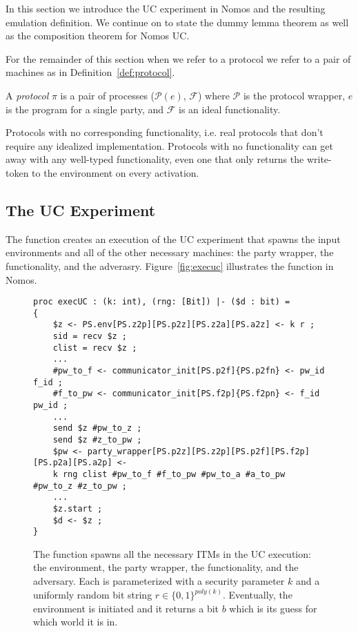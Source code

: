 In this section we introduce the UC experiment in Nomos and the resulting emulation definition.
We continue on to state the dummy lemma theorem as well as the composition theorem for Nomos UC.

For the remainder of this section when we refer to a protocol we refer to a pair of machines as in Definition~\ref{def:protocol}.

\begin{definition}\label{def:protocol}
	A \textit{protocol} $\pi$ is a pair of processes ($\mathcal{P}(e)$, $\mathcal{F}$) where $\mathcal{P}$ is the protocol wrapper, $e$ is the program for a single party, and $\mathcal{F}$ is an ideal functionality.
\end{definition}
 
Protocols with no corresponding functionality, i.e. real protocols that don't require any idealized implementation.
Protocols with no functionality can get away with any well-typed functionality, even one that only returns the write-token to the environment on every activation.


\subsection{The UC Experiment}
The  function creates an execution of the UC experiment that spawns the input environments and all of the other necessary machines: the party wrapper, the functionality, and the adverasry.
Figure~\ref{fig:execuc} illustrates the function in Nomos.

\begin{figure*}
\begin{lstlisting}[basicstyle=\small\ttfamily]
proc execUC : (k: int), (rng: [Bit]) |- ($d : bit) = 
{
    $z <- PS.env[PS.z2p][PS.p2z][PS.z2a][PS.a2z] <- k r ;
    sid = recv $z ;
    clist = recv $z ;
    ...
    #pw_to_f <- communicator_init[PS.p2f]{PS.p2fn} <- pw_id f_id ;
	#f_to_pw <- communicator_init[PS.f2p]{PS.f2pn} <- f_id pw_id ;
	...
	send $z #pw_to_z ;
	send $z #z_to_pw ;
	$pw <- party_wrapper[PS.p2z][PS.z2p][PS.p2f][PS.f2p][PS.p2a][PS.a2p] <-
	k rng clist #pw_to_f #f_to_pw #pw_to_a #a_to_pw #pw_to_z #z_to_pw ;
	...
    $z.start ;
    $d <- $z ;
}
\end{lstlisting}
\caption{The  function spawns all the necessary ITMs in the UC execution: the environment, the party wrapper, the functionality, and the adversary. Each is parameterized with a security parameter $k$ and a uniformly random bit string $r \in \{0,1\}^{poly(k)}$. Eventually, the environment is initiated and it returns a bit $b$ which is its guess for which world it is in.}
\label{lst:execuc}
\end{figure*}

